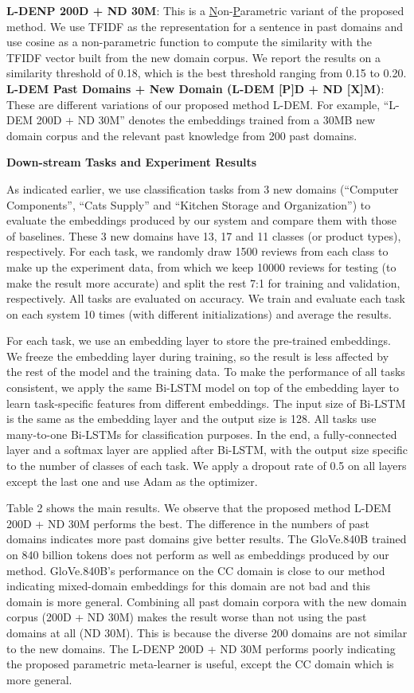\textbf{L-DENP 200D + ND 30M}: This is a \underline{N}on-\underline{P}arametric variant of the proposed method. We use TFIDF as the representation for a sentence in past domains and use cosine as a non-parametric function to compute the similarity with the TFIDF vector built from the new domain corpus. 
We report the results on a similarity threshold of 0.18, which is the best threshold ranging from 0.15 to 0.20.\\
\textbf{L-DEM Past Domains + New Domain (L-DEM [P]D + ND [X]M)}: These are different variations of our proposed method L-DEM. For example, ``L-DEM 200D + ND 30M'' denotes the embeddings trained from a 30MB new domain corpus and the relevant past knowledge from 200 past domains.

\textbf{Down-stream Tasks and Experiment Results}

As indicated earlier, we use classification tasks from 3 new domains (``Computer Components'', ``Cats Supply'' and ``Kitchen Storage and Organization'') to evaluate the embeddings produced by our system and compare them with those of baselines. 
These 3 new domains have 13, 17 and 11 classes (or product types), respectively.
For each task, we randomly draw 1500 reviews from each class to make up the experiment data, from which we keep 10000 reviews for testing (to make the result more accurate) and split the rest 7:1 for training and validation, respectively.
All tasks are evaluated on accuracy.
We train and evaluate each task on each system 10 times (with different initializations) and average the results.

For each task, we use an embedding layer to store the pre-trained embeddings.
We freeze the embedding layer during training, so the result is less affected by the rest of the model and the training data.
To make the performance of all tasks consistent, 
we apply the same Bi-LSTM model \cite{hochreiter1997long} on top of the embedding layer to learn task-specific features from different embeddings.
The input size of Bi-LSTM is the same as the embedding layer and the output size is 128.
All tasks use many-to-one Bi-LSTMs for classification purposes.
In the end, a fully-connected layer and a softmax layer are applied after Bi-LSTM, with the output size specific to the number of classes of each task.
We apply a dropout rate of 0.5 on all layers except the last one and use Adam \cite{kingma2014adam} as the optimizer.

Table 2 shows the main results. 
We observe that the proposed method L-DEM 200D + ND 30M performs the best.
The difference in the numbers of past domains indicates more past domains give better results.
The GloVe.840B trained on 840 billion tokens does not perform as well as embeddings produced by our method. 
GloVe.840B's performance on the CC domain is close to our method indicating mixed-domain embeddings for this domain are not bad and this domain is more general.  
Combining all past domain corpora with the new domain corpus (200D + ND 30M) makes the result worse than not using the past domains at all (ND 30M).
This is because the diverse 200 domains are not similar to the new domains.
The L-DENP 200D + ND 30M performs poorly indicating the proposed parametric meta-learner is useful, except the CC domain which is more general.

